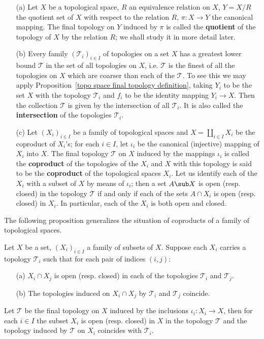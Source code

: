 \begin{example}
\mbox{}
\begin{enumerate}
\item[(a)] Let $X$ be a topological space, $R$ an equivalence relation on $X$, $Y=X/R$ the quotient set of $X$ with respect to the relation $R$, $\pi:X\to Y$ the canonical mapping. The final topology on $Y$ induced by $\pi$ is called the \textbf{quotient} of the topology of $X$ by the relation $R$; we shall study it in more detail later.
\item[(b)] Every family $(\mathcal{T}_i)_{i\in I}$ of topologies on a set $X$ has a greatest lower bound $\mathcal{T}$ in the set of all topologies on $X$, i.e. $\mathcal{T}$ is the finest of all the topologies on $X$ which are coarser than each of the $\mathcal{T}$. To see this we may apply Proposition~\ref{topo space final topology definition}, taking $Y_i$ to be the set $X$ with the topology $\mathcal{T}_i$ and $f_i$ to be the identity mapping $Y_i\to X$. Then the collection $\mathcal{T}$ is given by the intersection of all $\mathcal{T}_i$. It is also called the \textbf{intersection} of the topologies $\mathcal{T}_i$.
\item[(c)] Let $(X_i)_{i\in I}$ be a family of topological spaces and $X=\coprod_{i\in I}X_i$ be the coproduct of $X_i$'s; for each $i\in I$, let $\iota_i$ be the canonical (injective) mapping of $X_i$ into $X$. The final topology $\mathcal{T}$ on $X$ induced by the mappings $\iota_i$ is called the \textbf{coproduct} of the topologies of the $X_i$ and $X$ with this topology is said to be the \textbf{coproduct} of the topological spaces $X_i$. Let us identify each of the $X_i$ with a subset of $X$ by means of $\iota_i$; then a set $A\sub X$ is open (resp. closed) in the topology $\mathcal{T}$ if and only if each of the sets $A\cap X_i$ is open (resp. closed) in $X_i$. In particular, each of the $X_i$ is both open and closed.
\end{enumerate}
\end{example}
The following proposition generalizes the situation of coproducts of a family of topological spaces.
\begin{proposition}\label{topo space pasting topology}
Let $X$ be a set, $(X_i)_{i\in I}$ a family of subsets of $X$. Suppose each $X_i$ carries a topology $\mathcal{T}_i$ such that for each pair of indices $(i,j)$:
\begin{itemize}
\item[(a)] $X_i\cap X_j$ is open (resp. closed) in each of the topologies $\mathcal{T}_i$ and $\mathcal{T}_j$.
\item[(b)] The topologies induced on $X_i\cap X_j$ by $\mathcal{T}_i$ and $\mathcal{T}_j$ coincide.
\end{itemize}
Let $\mathcal{T}$ be the final topology on $X$ induced by the inclusions $\iota_i:X_i\to X$, then for each $i\in I$ the subset $X_i$ is open (resp. closed) in $X$ in the topology $\mathcal{T}$ and the topology induced by $\mathcal{T}$ on $X_i$ coincides with $\mathcal{T}_i$.
\end{proposition}
